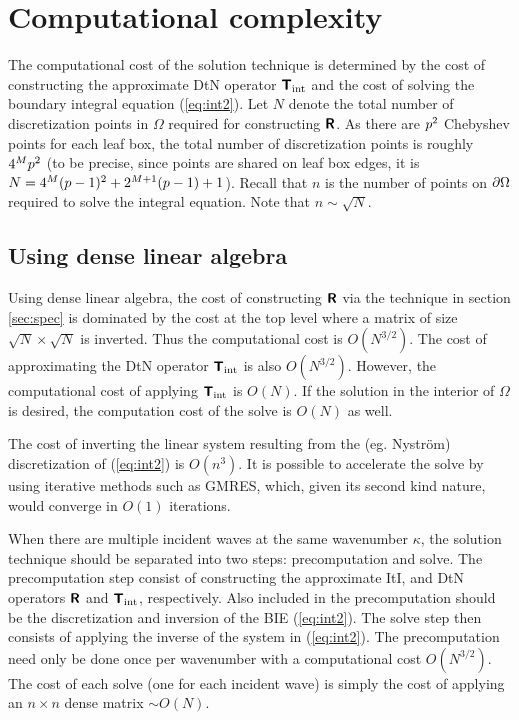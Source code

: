 \documentclass[11pt,final]{amsart}
\theoremstyle{definition}
\numberwithin{remark}{section}
\numberwithin{definition}{section}
\numberwithin{pro}{section}
\begin{document}
\section{Computational complexity}
\label{sec:cost}

The computational cost of the solution technique is determined by the cost of constructing the approximate
DtN operator $\bm{\mathsf{T}}_{\rm int}$ and the cost of solving the boundary integral equation (\ref{eq:int2}).  Let $N$ denote
the total number of discretization points in $\Omega$ required for constructing $\bm{\mathsf{R}}$.  As there are $p^2$ Chebyshev points for each
leaf box, the total number of discretization points is roughly $4^Mp^2$ (to be precise,
since points are shared on leaf box edges, it is
$N = 4^M(p-1)^2+2^{M+1}(p-1)+1$).   Recall that $n$ is the number of points on
${\partial\Omega}$ required to solve the integral equation.  Note that $n \sim \sqrt{N}$.


\subsection{Using dense linear algebra}
\label{sec:N1.5}
Using dense linear algebra, the cost of constructing $\bm{\mathsf{R}}$ via the technique in section \ref{sec:spec}
is dominated by the cost at the top level where a matrix of size
$\sqrt{N}\times \sqrt{N}$ is inverted.  Thus the computational cost is $O(N^{3/2})$.  The cost
of approximating the DtN operator $\bm{\mathsf{T}}_{\rm int}$ is also $O(N^{3/2})$.  However,
the computational cost of applying $\bm{\mathsf{T}}_{\rm int}$ is $O(N)$.  If the solution
in the interior of $\Omega$ is desired, the computation cost of the solve is $O(N)$ as well.

The cost of inverting the linear system resulting from the (eg. Nystr\"om) discretization of (\ref{eq:int2}) is $O(n^3)$.
It is possible to accelerate the solve by using iterative methods such as GMRES,
which, given its second kind nature, would converge in $O(1)$ iterations.

When there are multiple incident waves at the same wavenumber $\kappa$, the solution technique should be separated into
two steps: precomputation and solve.  The precomputation step consist of constructing the approximate ItI, and DtN operators
$\bm{\mathsf{R}}$ and $\bm{\mathsf{T}}_{\rm int}$, respectively.  Also included in the precomputation should
be the discretization and inversion of the BIE (\ref{eq:int2}).  The solve step then consists of applying the
inverse of the system in (\ref{eq:int2}).  The precomputation need only be done once per wavenumber with
a computational cost $O(N^{3/2})$.  The cost of each solve (one for each incident wave) is simply the cost
of applying an $n\times n$ dense matrix $\sim O(N)$.
\end{document}
